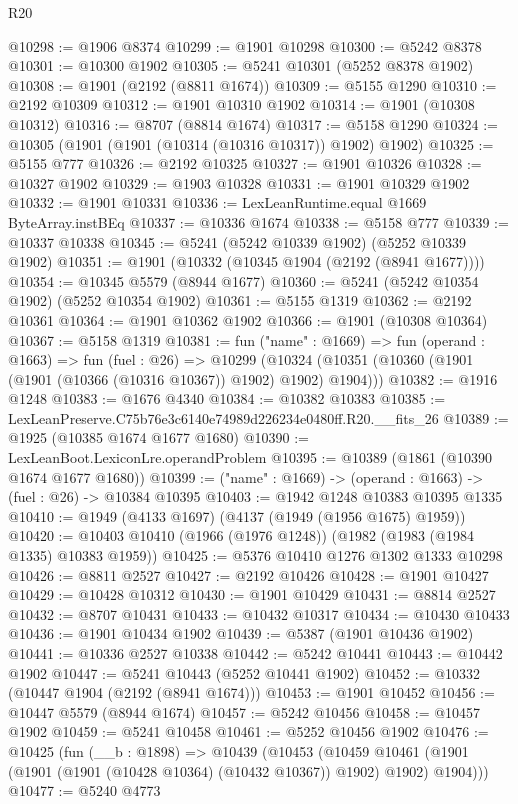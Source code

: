 \begin{lexlean}{R20}
\begin{coremodule}
@10298 := @1906 @8374
@10299 := @1901 @10298
@10300 := @5242 @8378
@10301 := @10300 @1902
@10305 := @5241 @10301 (@5252 @8378 @1902)
@10308 := @1901 (@2192 (@8811 @1674))
@10309 := @5155 @1290
@10310 := @2192 @10309
@10312 := @1901 @10310 @1902
@10314 := @1901 (@10308 @10312)
@10316 := @8707 (@8814 @1674)
@10317 := @5158 @1290
@10324 := @10305 (@1901 (@1901 (@10314 (@10316 @10317)) @1902) @1902)
@10325 := @5155 @777
@10326 := @2192 @10325
@10327 := @1901 @10326
@10328 := @10327 @1902
@10329 := @1903 @10328
@10331 := @1901 @10329 @1902
@10332 := @1901 @10331
@10336 := LexLeanRuntime.equal @1669 ByteArray.instBEq
@10337 := @10336 @1674
@10338 := @5158 @777
@10339 := @10337 @10338
@10345 := @5241 (@5242 @10339 @1902) (@5252 @10339 @1902)
@10351 := @1901 (@10332 (@10345 @1904 (@2192 (@8941 @1677))))
@10354 := @10345 @5579 (@8944 @1677)
@10360 := @5241 (@5242 @10354 @1902) (@5252 @10354 @1902)
@10361 := @5155 @1319
@10362 := @2192 @10361
@10364 := @1901 @10362 @1902
@10366 := @1901 (@10308 @10364)
@10367 := @5158 @1319
@10381 := fun ("name" : @1669) =>
  fun (operand : @1663) =>
  fun (fuel : @26) =>
  @10299 (@10324 (@10351 (@10360 (@1901 (@1901 (@10366 (@10316 @10367)) @1902) @1902) @1904)))
@10382 := @1916 @1248
@10383 := @1676 @4340
@10384 := @10382 @10383
@10385 := LexLeanPreserve.C75b76e3c6140e74989d226234e0480ff.R20.__fits_26
@10389 := @1925 (@10385 @1674 @1677 @1680)
@10390 := LexLeanBoot.LexiconLre.operandProblem
@10395 := @10389 (@1861 (@10390 @1674 @1677 @1680))
@10399 := ("name" : @1669) -> (operand : @1663) -> (fuel : @26) -> @10384 @10395
@10403 := @1942 @1248 @10383 @10395 @1335
@10410 := @1949 (@4133 @1697) (@4137 (@1949 (@1956 @1675) @1959))
@10420 := @10403 @10410 (@1966 (@1976 @1248)) (@1982 (@1983 (@1984 @1335) @10383 @1959))
@10425 := @5376 @10410 @1276 @1302 @1333 @10298
@10426 := @8811 @2527
@10427 := @2192 @10426
@10428 := @1901 @10427
@10429 := @10428 @10312
@10430 := @1901 @10429
@10431 := @8814 @2527
@10432 := @8707 @10431
@10433 := @10432 @10317
@10434 := @10430 @10433
@10436 := @1901 @10434 @1902
@10439 := @5387 (@1901 @10436 @1902)
@10441 := @10336 @2527 @10338
@10442 := @5242 @10441
@10443 := @10442 @1902
@10447 := @5241 @10443 (@5252 @10441 @1902)
@10452 := @10332 (@10447 @1904 (@2192 (@8941 @1674)))
@10453 := @1901 @10452
@10456 := @10447 @5579 (@8944 @1674)
@10457 := @5242 @10456
@10458 := @10457 @1902
@10459 := @5241 @10458
@10461 := @5252 @10456 @1902
@10476 := @10425
    (fun (__b : @1898) =>
    @10439
      (@10453
        (@10459 @10461 (@1901 (@1901 (@1901 (@10428 @10364) (@10432 @10367)) @1902) @1902) @1904)))
@10477 := @5240 @4773

\end{coremodule}
\end{lexlean}
